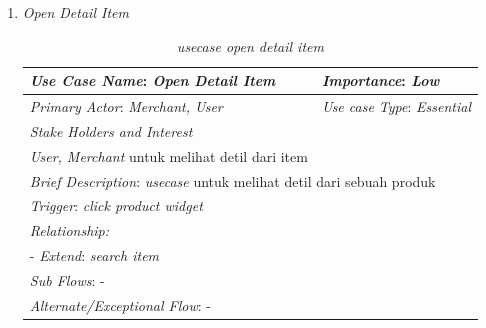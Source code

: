 \documentclass[a4paper]{article}
\begin{document}
\begin{enumerate}
\begin{enumerate}
        \item \textit{Open Detail Item}
        \begin{table}[h]
            \centering
            \begin{tabular}{|lll}
            \hline
            \multicolumn{1}{|l|}{\textit{Use Case Name}: \textit{Open Detail Item}}             & \multicolumn{2}{l|}{\textit{Importance}: \textit{Low}}   \\ \hline
            \multicolumn{1}{|l|}{\textit{Primary Actor}: \textit{Merchant, User}}             & \multicolumn{2}{l|}{\textit{Use case Type}: \textit{Essential}} \\ \hline
            \multicolumn{1}{|l|}{\textit{Stake Holders and Interest}} &                               &                               \\ \cline{1-1}
            \multicolumn{1}{|l|}{\textit{User, Merchant} untuk melihat detil dari item}                                                     &                               &                               \\ \hline
            \multicolumn{3}{|l|}{\textit{Brief Description}: \textit{usecase} untuk melihat detil dari sebuah produk}                                                                         \\ \hline
            \multicolumn{3}{|l|}{\textit{Trigger}: \textit{click product widget} }                                                                                   \\ \hline
            \multicolumn{3}{|l|}{\textit{Relationship:}}                                                                              \\ \hline
            \multicolumn{3}{|l|}{- \textit{Extend}: \textit{search item}}                                                                                                                     \\ \hline
            \multicolumn{3}{|l|}{\textit{Sub Flows}: -}                                                                                 \\ \hline
            \multicolumn{3}{|l|}{\textit{Alternate/Exceptional Flow}: -}                                                                \\ \hline
            \end{tabular}
            \caption{\textit{usecase open detail item}}
        \end{table}


\end{enumerate}
\end{enumerate}
\end{document}
